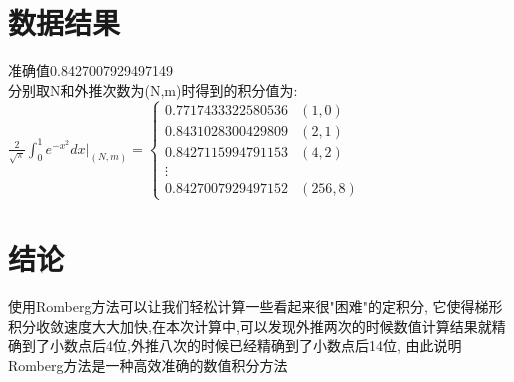 \documentclass[12pt, a4paper, oneside]{ctexart}
\begin{document}
\pagebreak

\section*{数据结果}
准确值0.8427007929497149  \\
分别取N和外推次数为(N,m)时得到的积分值为:
$\frac{2}{\sqrt{\pi}}\int_0^1e^{-x^2}dx|_{(N,m)}=\begin{cases} 
  0.7717433322580536 & (1,0)\\
  0.8431028300429809 & (2,1)\\
  0.8427115994791153 & (4,2)\\
  \vdots \\
  0.8427007929497152 & (256,8)
\end{cases}$

\section*{结论}
使用Romberg方法可以让我们轻松计算一些看起来很"困难"的定积分,
它使得梯形积分收敛速度大大加快,在本次计算中,可以发现外推两次的时候数值计算结果就精确到了小数点后4位,外推八次的时候已经精确到了小数点后14位,
由此说明Romberg方法是一种高效准确的数值积分方法
\end{document}
